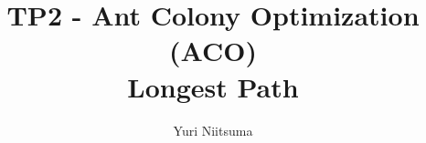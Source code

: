 \documentclass[journal]{IEEEtran}
\begin{document}
  \title{TP2 - Ant Colony Optimization (ACO)\\
  Longest Path} 
  \author{Yuri Niitsuma}

\maketitle

% 






\end{document}

